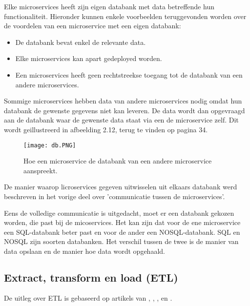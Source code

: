 Elke microservices heeft zijn eigen databank met data betreffende hun functionaliteit. Hieronder kunnen enkele voorbeelden teruggevonden worden over de voordelen van een microservice met een eigen databank:
\begin{itemize}
	\item De databank bevat enkel de relevante data.
	\item Elke microservices kan apart gedeployed worden. 
	\item Een microservices heeft geen rechtstreekse toegang tot de databank van een andere microservices. 
\end{itemize}

Sommige microservices hebben data van andere microservices nodig omdat hun databank de gewenste gegevens niet kan leveren. De data wordt dan opgevraagd aan de databank waar de gewenste data staat via een de microservice zelf. Dit wordt geillustreerd in afbeelding 2.12, terug te vinden op pagina 34.
\begin{figure}[h!]
	\texttt{[image: db.PNG]}
	\centering
	\caption{Hoe een microservice de databank van een andere microservice aanspreekt.}
\end{figure}
 
 De manier waarop licroservices gegeven uitwisselen uit elkaars databank werd beschreven in het vorige deel over 'communicatie tussen de microservices'.
 
 Eens de volledige communicatie is uitgedacht, moet er een databank gekozen worden, die past bij de micoservices. Het kan zijn dat voor de ene microservice een SQL-databank beter past en voor de ander een NOSQL-databank. SQL en NOSQL zijn soorten databanken. Het verschil tussen de twee is de manier van data opslaan en de manier hoe data wordt opgehaald.
 
\subsection{Extract, transform en load (ETL)}
De uitleg over ETL is gebaseerd op artikels van \textcite{Loshin2019}, \textcite{Alley2018}, \textcite{Stich2019}, \textcite{Guru2019} en \textcite{Naveen2016}.

